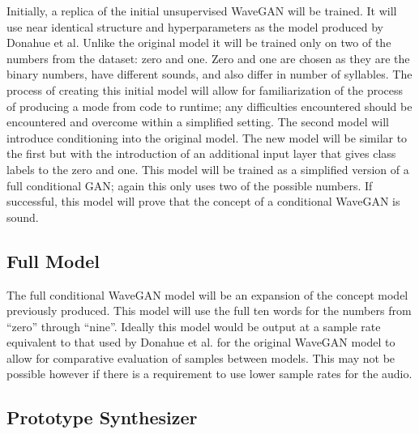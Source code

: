 \documentclass{article}
\begin{document}
Initially, a replica of the initial unsupervised WaveGAN will be trained.
It will use near identical structure and hyperparameters as the model produced by Donahue et al.
Unlike the original model it will be trained only on two of the numbers from the dataset: zero and one.
Zero and one are chosen as they are the binary numbers, have different sounds, and also differ in number of syllables.
The process of creating this initial model will allow for familiarization of the process of producing a mode from code to runtime; any difficulties encountered should be encountered and overcome within a simplified setting. 
\newline
\newline
The second model will introduce conditioning into the original model.
The new model will be similar to the first but with the introduction of an additional input layer that gives class labels to the zero and one.
This model will be trained as a simplified version of a full conditional GAN; again this only uses two of the possible numbers.
If successful, this model will prove that the concept of a conditional WaveGAN is sound.

\subsection{Full Model}

The full conditional WaveGAN model will be an expansion of the concept model previously produced.
This model will use the full ten words for the numbers from ``zero'' through ``nine''.
Ideally this model would be output at a sample rate equivalent to that used by Donahue et al. for the original WaveGAN model to allow for comparative evaluation of samples between models.
This may not be possible however if there is a requirement to use lower sample rates for the audio.

\subsection{Prototype Synthesizer}
\end{document}
